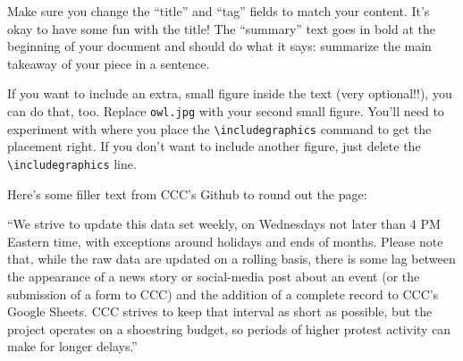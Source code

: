 \documentclass{article}
\begin{document}
\begin{multicols}{3}
Make sure you change the ``title'' and ``tag'' fields to match your
content. It's okay to have some fun with the title! The ``summary'' text
goes in bold at the beginning of your document and should do what it
says: summarize the main takeaway of your piece in a sentence.

If you want to include an extra, small figure inside the text (very
optional!!), you can do that, too. Replace \texttt{owl.jpg} with your
second small figure. You'll need to experiment with where you place the
\texttt{\textbackslash{}includegraphics} command to get the placement
right. If you don't want to include another figure, just delete the
\texttt{\textbackslash{}includegraphics} line.

Here's some filler text from CCC's Github to round out the page:

``We strive to update this data set weekly, on Wednesdays not later than
4 PM Eastern time, with exceptions around holidays and ends of months.
Please note that, while the raw data are updated on a rolling basis,
there is some lag between the appearance of a news story or social-media
post about an event (or the submission of a form to CCC) and the
addition of a complete record to CCC's Google Sheets. CCC strives to
keep that interval as short as possible, but the project operates on a
shoestring budget, so periods of higher protest activity can make for
longer delays.''~\helmet %
    \end{multicols}

    
\end{document}
